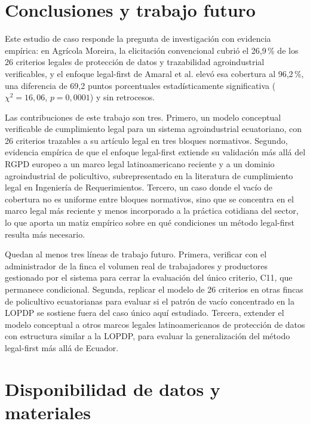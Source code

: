 \documentclass[pdflatex,sn-mathphys-num]{sn-jnl}
\begin{document}
\section{Conclusiones y trabajo futuro}\label{sec:conclusiones}

Este estudio de caso responde la pregunta de investigaci\'on con evidencia emp\'irica: en Agr\'icola Moreira, la elicitaci\'on convencional cubri\'o el 26,9\,\% de los 26 criterios legales de protecci\'on de datos y trazabilidad agroindustrial verificables, y el enfoque legal-first de Amaral et al. \cite{amaral2021} elev\'o esa cobertura al 96,2\,\%, una diferencia de 69,2 puntos porcentuales estad\'isticamente significativa ($\chi^2=16,06$, $p=0,0001$) y sin retrocesos.

Las contribuciones de este trabajo son tres. Primero, un modelo conceptual verificable de cumplimiento legal para un sistema agroindustrial ecuatoriano, con 26 criterios trazables a su art\'iculo legal en tres bloques normativos. Segundo, evidencia emp\'irica de que el enfoque legal-first extiende su validaci\'on m\'as all\'a del RGPD europeo a un marco legal latinoamericano reciente y a un dominio agroindustrial de policultivo, subrepresentado en la literatura de cumplimiento legal en Ingenier\'ia de Requerimientos. Tercero, un caso donde el vac\'io de cobertura no es uniforme entre bloques normativos, sino que se concentra en el marco legal m\'as reciente y menos incorporado a la pr\'actica cotidiana del sector, lo que aporta un matiz emp\'irico sobre en qu\'e condiciones un m\'etodo legal-first resulta m\'as necesario.

Quedan al menos tres l\'ineas de trabajo futuro. Primera, verificar con el administrador de la finca el volumen real de trabajadores y productores gestionado por el sistema para cerrar la evaluaci\'on del \'unico criterio, C11, que permanece condicional. Segunda, replicar el modelo de 26 criterios en otras fincas de policultivo ecuatorianas para evaluar si el patr\'on de vac\'io concentrado en la LOPDP se sostiene fuera del caso \'unico aqu\'i estudiado. Tercera, extender el modelo conceptual a otros marcos legales latinoamericanos de protecci\'on de datos con estructura similar a la LOPDP, para evaluar la generalizaci\'on del m\'etodo legal-first m\'as all\'a de Ecuador.

\backmatter

\section*{Disponibilidad de datos y materiales}
\end{document}

